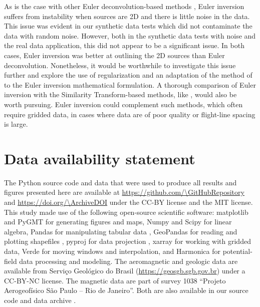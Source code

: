 As is the case with other Euler deconvolution-based methods
\citep{Mushayandebvu2004},
Euler inversion suffers from instability when sources are 2D and there is
little noise in the data.
This issue was evident in our synthetic data tests which did not contaminate
the data with random noise.
However, both in the synthetic data tests with noise and the real data
application, this did not appear to be a significant issue.
In both cases, Euler inversion was better at outlining the 2D sources than
Euler deconvolution.
Nonetheless, it would be worthwhile to investigate this issue further and
explore the use of regularization and an adaptation of the method of
\citet{Mushayandebvu2004} to the Euler inversion mathematical formulation.
A thorough comparison of Euler inversion with the Similarity Transform-based
methods, like \citet{Gerovska2010}, would also be worth pursuing.
Euler inversion could complement such methods, which often require gridded
data, in cases where data are of poor quality or flight-line spacing is large.


\section*{Data availability statement}

The Python source code and data that were used to produce all results and
figures presented here are available at
\url{https://github.com/\GitHubRepository}
and \url{https://doi.org/\ArchiveDOI} \citep{figshare}
under the CC-BY license and the MIT license.
This study made use of the following open-source scientific software:
matplotlib \citep{matplotlib} and PyGMT \citep{pygmt} for generating figures
and maps,
Numpy \citep{numpy} and Scipy \citep{scipy} for linear algebra,
Pandas for manipulating tabular data \citep{McKinney2010,pandas},
GeoPandas for reading and plotting shapefiles \citep{geopandas},
pyproj for data projection \citep{pyproj},
xarray \citep{xarray} for working with gridded data,
Verde \citep{verde} for moving windows and interpolation,
and Harmonica \citep{harmonica} for potential-field data processing and
modeling.
The aeromagnetic and geologic data are available from Serviço Geológico do
Brasil (\url{https://geosgb.sgb.gov.br}) under a CC-BY-NC license.
The magnetic data are part of survey 1038 ``Projeto Aerogeofísico São Paulo --
Rio de Janeiro''.
Both are also available in our source code and data archive \citep{figshare}.


